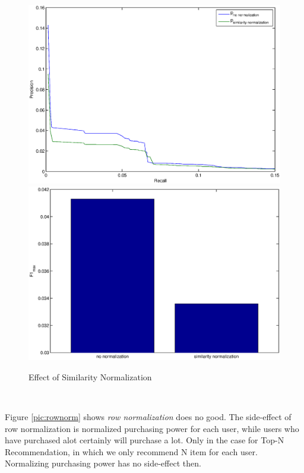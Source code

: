 \documentclass[11pt,a4paper,titlepage]{article}
\begin{document}
\begin{figure}[!h]
\includegraphics[width=\linewidth]{./sim_norm.eps}
\includegraphics[width=\linewidth]{./sim_norm_f1.eps}
\caption{Effect of Similarity Normalization}
\label{pic:simnorm}
\end{figure}

~

Figure \ref{pic:rownorm} shows \emph{row normalization} does no good. The side-effect of row normalization is normalized purchasing power for each user, while users who have purchased alot certainly will purchase a lot. Only in the case for Top-N Recommendation, in which we only recommend N item for each user. Normalizing purchasing power has no side-effect then.\cite{deshpande2004item}
\end{document}
